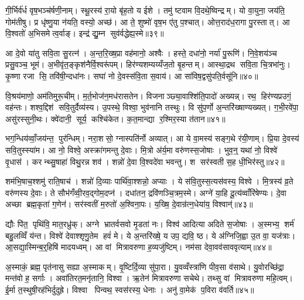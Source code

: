 गी॒र्भिर्व॑र्ध वृष॒भञ्च॑र्\mbox{}षणी॒नाम्। स्थू॒रस्य॑ रा॒यो बृ॑ह॒तो य ईशे। तमु॑ ष्टवाम वि॒दथे॒ष्विन्द्रम्। यो वा॒युना॒ जय॑ति॒ गोम॑तीषु। प्र धृ॑ष्णु॒या न॑यति॒ वस्यो॒ अच्छ॑। आ ते॒ शुष्मो॑ वृष॒भ ए॑तु प॒श्चात्। ओत्त॒राद॑ध॒रागा पु॒रस्तात्। आ वि॒श्वतो॑ अ॒भिसमेत्व॒र्वाङ्। इन्द्र॑ द्यु॒म्न सुव॑र्वद्धेह्य॒स्मे॥३९॥\anuvakamend[व॒राहैर्वि॒श्वहा॑ऽजनिष्ट पू॒षोद्वरी॑वृजत्खा॒दयो॑ वः पा॒न्त्यस्त्या॒भिर्नव॑ च]

आ दे॒वो या॑तु सवि॒ता सु॒रत्न॑। अ॒न्त॒रि॒ख्ष॒प्रा वह॑मानो॒ अश्वैः। हस्ते॒ दधा॑नो॒ नर्या॑ पु॒रूणि॑। नि॒वे॒शय॑ञ्च प्रसु॒वञ्च॒ भूम॑। अ॒भीवृ॑त॒ङ्कृश॑नैर्वि॒श्वरू॑पम्। हिर॑ण्यशम्यय्यँज॒तो बृ॒हन्तम्। आस्था॒द्रथ सवि॒ता चि॒त्रभा॑नुः। कृ॒ष्णा रजा सि॒ तवि॑षी॒न्दधा॑नः। सघा॑ नो दे॒वस्स॑वि॒ता स॒वाय॑। आ सा॑विष॒द्वसु॑पति॒र्वसू॑नि॥४०॥

वि॒श्रय॑माणो॒ अम॑तिमुरू॒चीम्। म॒र्त॒भोज॑न॒मध॑रासतेन। विजनाञ्छ्या॒वाश्शि॑ति॒पादो॑ अख्यन्न्। रथ॒ हिर॑ण्यप्रउगं॒ वह॑न्तः। शश्व॒द्दिश॑ सवि॒तुर्दैव्य॑स्य। उ॒पस्थे॒ विश्वा॒ भुव॑नानि तस्थुः। वि सु॑प॒र्णो अ॒न्तरि॑ख्षाण्यख्यत्। ग॒भी॒रवे॑पा॒ असु॑रस्सुनी॒थः। क्वे॑दानी॒ सूर्य॒ कश्चि॑केत। क॒त॒मान्द्या र॒श्मिर॒स्या त॑तान॥४१॥

भग॒न्धिय॑व्वाँ॒जय॑न्त॒ पुर॑न्धिम्। नरा॒शसो॒ ग्नास्पति॑र्नो अव्यात्। आ ये वा॒मस्य॑ सङ्ग॒थे र॑यी॒णाम्। प्रि॒या दे॒वस्य॑ सवि॒तुस्स्या॑म। आ नो॒ विश्वे॒ अस्क्रा॑गमन्तु दे॒वाः। मि॒त्रो अ॑र्य॒मा वरु॑णस्स॒जोषाः। भुव॒न्॒ यथा॑ नो॒ विश्वे॑ वृ॒धास॑। करन्थ्सु॒षाहा॑ विथु॒रन्न शव॑। शन्नो॑ दे॒वा वि॒श्वदे॑वा भवन्तु। श सर॑स्वती स॒ह धी॒भिर॑स्तु॥४२॥

शम॑भि॒षाच॒श्शमु॑ राति॒षाच॑। शन्नो॑ दि॒व्याः पार्थि॑वा॒श्शन्नो॒ अप्याः। ये स॑वि॒तुस्स॒त्यस॑वस्य॒ विश्वे। मि॒त्रस्य॑ व्र॒ते वरु॑णस्य दे॒वाः। ते सौभ॑गँव्वी॒रव॒द्गोम॒दप्न॑। दधा॑तन॒ द्रवि॑णञ्चि॒त्रम॒स्मे। अग्ने॑ या॒हि दू॒त्य॑व्वाँरि॑षेण्यः। दे॒वा अच्छा ब्रह्म॒कृता॑ ग॒णेन॑। सर॑स्वतीं म॒रुतो॑ अ॒श्विना॒पः। य॒ख्षि॒ दे॒वान्र॑त्न॒धेया॑य॒ विश्वान्॑॥४३॥

द्यौः पि॑त॒ पृथि॑वि॒ मात॒रध्रु॑क्। अग्ने भ्रातर्वसवो मृ॒डता॑ नः। विश्व॑ आदित्या अदिते स॒जोषाः। अ॒स्मभ्य॒ शर्म॑ बहु॒लव्विँ य॑न्त। विश्वे॑ देवाश्शृणु॒तेम हवं॑ मे। ये अ॒न्तरि॑ख्षे॒ य उप॒ द्यवि॒ ष्ठ। ये अ॑ग्निजि॒ह्वा उ॒त वा॒ यज॑त्राः। आ॒सद्या॒स्मिन्ब॒र्॒हिषि॑ मादयध्वम्। आ वां मित्रावरुणा ह॒व्यजु॑ष्टिम्। नम॑सा देवा॒वव॑साववृत्याम्॥४४॥

अ॒स्माकं॒ ब्रह्म॒ पृत॑नासु सह्या अ॒स्माकम्। वृ॒ष्टिर्दि॒व्या सु॑पा॒रा। यु॒वव्वँस्त्रा॑णि पीव॒सा व॑साथे। यु॒वोरच्छि॑द्रा॒ मन्त॑वो ह॒ सर्गाः। अवा॑तिरत॒मनृ॑तानि॒ विश्वा। ऋ॒तेन॑ मित्रावरुणा सचेथे। तथ्सु वां मित्रावरुणा महि॒त्वम्। ई॒र्मा त॒स्थुषी॒रह॑भिर्दुदुह्रे। विश्वा पिन्वथ॒ स्वस॑रस्य॒ धेनाः। अनु॑ वा॒मेक॑ प॒विरा व॑वर्ति॥४५॥


